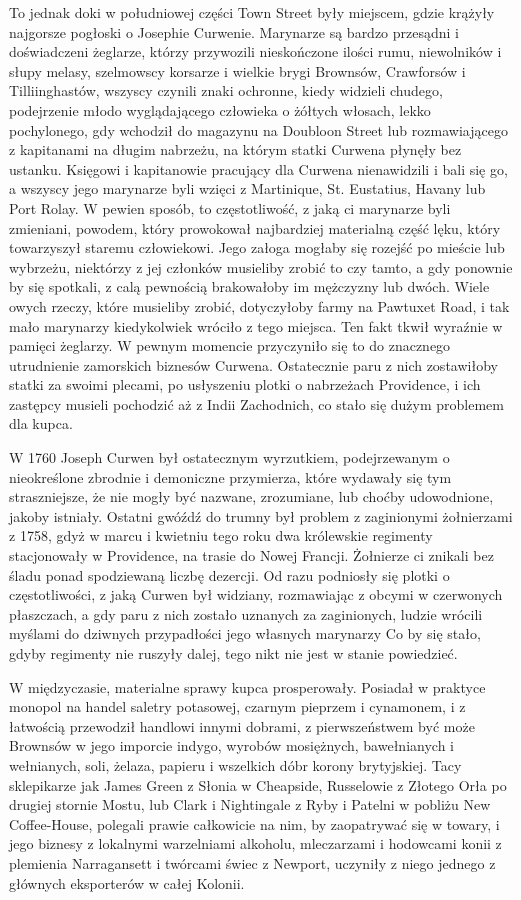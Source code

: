 To jednak doki w południowej części Town Street były miejscem, gdzie krążyły najgorsze pogłoski o Josephie Curwenie. Marynarze są bardzo przesądni i doświadczeni żeglarze, którzy przywozili nieskończone ilości rumu, niewolników i słupy melasy, szelmowscy korsarze i wielkie brygi Brownsów, Crawforsów i Tilliinghastów, wszyscy czynili znaki ochronne, kiedy widzieli chudego, podejrzenie młodo wyglądającego człowieka o żółtych włosach, lekko pochylonego, gdy wchodził do magazynu na Doubloon Street lub rozmawiającego z kapitanami na długim nabrzeżu, na którym statki Curwena płynęły bez ustanku. Księgowi i kapitanowie pracujący dla Curwena nienawidzili i bali się go, a wszyscy jego marynarze byli wzięci z Martinique, St. Eustatius, Havany lub Port Rolay. W pewien sposób, to częstotliwość, z jaką ci marynarze byli zmieniani, powodem, który prowokował najbardziej materialną część lęku, który towarzyszył staremu człowiekowi. Jego załoga mogłaby się rozejść po mieście lub wybrzeżu, niektórzy z jej członków musieliby zrobić to czy tamto, a gdy ponownie by się spotkali, z calą pewnością brakowałoby im mężczyzny lub dwóch. Wiele owych rzeczy, które musieliby zrobić, dotyczyłoby farmy na Pawtuxet Road, i tak mało marynarzy kiedykolwiek wróciło z tego miejsca. Ten fakt tkwił wyraźnie w pamięci żeglarzy. W pewnym momencie przyczyniło się to do znacznego utrudnienie zamorskich biznesów Curwena. Ostatecznie paru z nich zostawiłoby statki za swoimi plecami, po usłyszeniu plotki o nabrzeżach Providence, i ich zastępcy musieli pochodzić aż z Indii Zachodnich, co stało się dużym problemem dla kupca.

W 1760 Joseph Curwen był ostatecznym wyrzutkiem, podejrzewanym o nieokreślone zbrodnie i demoniczne przymierza, które wydawały się tym straszniejsze, że nie mogły być nazwane, zrozumiane, lub choćby udowodnione, jakoby istniały. Ostatni gwóźdź do trumny był problem z zaginionymi żołnierzami z 1758, gdyż w marcu i kwietniu tego roku  dwa królewskie regimenty stacjonowały w Providence, na trasie do Nowej Francji. Żołnierze ci znikali bez śladu ponad spodziewaną liczbę dezercji. Od razu podniosły się plotki o częstotliwości, z jaką Curwen był widziany, rozmawiając z obcymi w czerwonych płaszczach, a gdy paru z nich zostało uznanych za zaginionych, ludzie wrócili myślami do dziwnych przypadłości jego własnych marynarzy Co by się stało, gdyby regimenty nie ruszyły dalej, tego nikt nie jest w stanie powiedzieć. 

W międzyczasie, materialne sprawy kupca prosperowały. Posiadał w praktyce monopol na handel saletry potasowej, czarnym pieprzem i cynamonem, i z łatwością przewodził handlowi innymi dobrami, z pierwszeństwem być może Brownsów w jego imporcie indygo, wyrobów mosiężnych, bawełnianych i wełnianych, soli, żelaza, papieru i wszelkich dóbr korony brytyjskiej. Tacy sklepikarze jak James Green z Słonia w Cheapside, Russelowie z Złotego Orła po drugiej stornie Mostu, lub Clark i Nightingale z Ryby i Patelni w pobliżu New Coffee-House, polegali prawie całkowicie na nim, by zaopatrywać się w towary, i jego biznesy z lokalnymi warzelniami alkoholu, mleczarzami i hodowcami konii z plemienia Narragansett i twórcami świec z Newport, uczyniły z niego jednego z głównych eksporterów w całej Kolonii.

